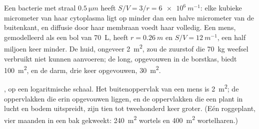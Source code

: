 \begin{example}\label{ex:b1:organism-environment:svnumbers}
Een bacterie met straal $\qty{0.5}{\micro m}$ heeft
$S/V = 3/r = \qty{6e6}{m^{-1}}$: elke kubieke micrometer van haar cytoplasma
ligt op minder dan een halve micrometer van de buitenkant, en diffusie door
haar membraan voedt haar volledig. Een mens, gemodelleerd als een bol van
\qty{70}{L}, heeft $r = \qty{0.26}{m}$ en $S/V = \qty{12}{m^{-1}}$, een half
miljoen keer minder. De huid, ongeveer \qty{2}{m^2}, zou de zuurstof die
\qty{70}{kg} weefsel verbruikt niet kunnen aanvoeren; de long, opgevouwen in
de borstkas, biedt \qty{100}{m^2}, en de darm, drie keer opgevouwen,
\qty{30}{m^2}.
\end{example}

\begin{omfigure}

{\small {}, op een logaritmische schaal. Het
buitenoppervlak van een mens is \qty{2}{m^2}; de oppervlakken die erin
opgevouwen liggen, en de oppervlakken die een plant in lucht en bodem
uitspreidt, zijn tien tot tweehonderd keer groter. (Eén roggeplant, vier
maanden in een bak gekweekt: \qty{240}{m^2} wortels en \qty{400}{m^2}
wortelharen.)}
\end{omfigure}

